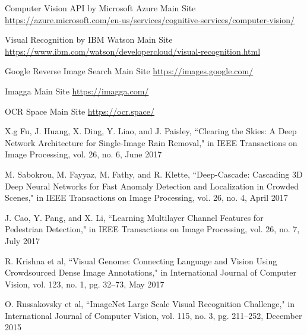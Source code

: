 %
%
%
\begin{thebibliography}{1}

Computer Vision API by Microsoft Azure Main Site \url{https://azure.microsoft.com/en-us/services/cognitive-services/computer-vision/}

Visual Recognition by IBM Watson Main Site \url{https://www.ibm.com/watson/developercloud/visual-recognition.html}

Google Reverse Image Search Main Site \url{https://images.google.com/}

Imagga Main Site \url{https://imagga.com/}

OCR Space Main Site \url{https://ocr.space/}

X.g Fu, J. Huang, X. Ding, Y. Liao, and J. Paisley, ``Clearing the Skies: A Deep Network Architecture for Single-Image Rain Removal," in IEEE Transactions on Image Processing, vol. 26, no. 6, June 2017

M. Sabokrou, M. Fayyaz, M. Fathy, and R. Klette, ``Deep-Cascade: Cascading 3D Deep Neural Networks for Fast Anomaly Detection and Localization in Crowded Scenes," in IEEE Transactions on Image Processing, vol. 26, no. 4, April 2017

J. Cao, Y. Pang, and X. Li, ``Learning Multilayer Channel Features for Pedestrian Detection," in IEEE Transactions on Image Processing, vol. 26, no. 7, July 2017


R. Krishna et al, ``Visual Genome: Connecting Language and Vision Using Crowdsourced Dense Image Annotations," in International Journal of Computer Vision, vol. 123, no. 1, pg. 32--73, May 2017


O. Russakovsky et al, ``ImageNet Large Scale Visual Recognition Challenge," in International Journal of Computer Vision, vol. 115, no. 3, pg. 211--252, December 2015


\end{thebibliography}
